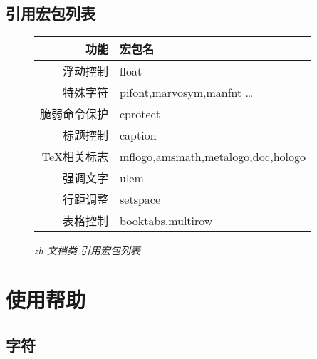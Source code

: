 \documentclass{zhart}
\begin{document}
\subsection{引用宏包列表}
\begin{figure}[H]
\centering
\caption*{\textit{zh 文档类 引用宏包列表}}
\begin{tabular}{rl}
\hline
功能&宏包名\\
\hline
浮动控制&float\\
特殊字符&pifont,marvosym,manfnt \ldots\\
脆弱命令保护&cprotect\\
标题控制&caption\\
\TeX 相关标志&mflogo,amsmath,metalogo,doc,hologo\\
强调文字&ulem\\
行距调整&setspace\\
表格控制&booktabs,multirow\\
\hline
\end{tabular}
\end{figure}
\newpage

\section{使用帮助}

\subsection{字符}
\end{document}
